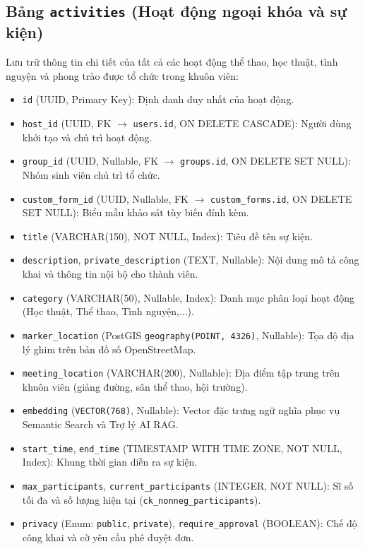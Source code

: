 \subsection{Bảng \texttt{activities} (Hoạt động ngoại khóa và sự kiện)}
Lưu trữ thông tin chi tiết của tất cả các hoạt động thể thao, học thuật, tình nguyện và phong trào được tổ chức trong khuôn viên:
\begin{itemize}[leftmargin=*, noitemsep, topsep=1pt]
    \item \texttt{id} (UUID, Primary Key): Định danh duy nhất của hoạt động.
    \item \texttt{host\_id} (UUID, FK $\rightarrow$ \texttt{users.id}, ON DELETE CASCADE): Người dùng khởi tạo và chủ trì hoạt động.
    \item \texttt{group\_id} (UUID, Nullable, FK $\rightarrow$ \texttt{groups.id}, ON DELETE SET NULL): Nhóm sinh viên chủ trì tổ chức.
    \item \texttt{custom\_form\_id} (UUID, Nullable, FK $\rightarrow$ \texttt{custom\_forms.id}, ON DELETE SET NULL): Biểu mẫu khảo sát tùy biến đính kèm.
    \item \texttt{title} (VARCHAR(150), NOT NULL, Index): Tiêu đề tên sự kiện.
    \item \texttt{description}, \texttt{private\_description} (TEXT, Nullable): Nội dung mô tả công khai và thông tin nội bộ cho thành viên.
    \item \texttt{category} (VARCHAR(50), Nullable, Index): Danh mục phân loại hoạt động (Học thuật, Thể thao, Tình nguyện,...).
    \item \texttt{marker\_location} (PostGIS \texttt{geography(POINT, 4326)}, Nullable): Tọa độ địa lý ghim trên bản đồ số OpenStreetMap.
    \item \texttt{meeting\_location} (VARCHAR(200), Nullable): Địa điểm tập trung trên khuôn viên (giảng đường, sân thể thao, hội trường).
    \item \texttt{embedding} (\texttt{VECTOR(768)}, Nullable): Vector đặc trưng ngữ nghĩa phục vụ Semantic Search và Trợ lý AI RAG.
    \item \texttt{start\_time}, \texttt{end\_time} (TIMESTAMP WITH TIME ZONE, NOT NULL, Index): Khung thời gian diễn ra sự kiện.
    \item \texttt{max\_participants}, \texttt{current\_participants} (INTEGER, NOT NULL): Sĩ số tối đa và số lượng hiện tại (\texttt{ck\_nonneg\_participants}).
    \item \texttt{privacy} (Enum: \texttt{public}, \texttt{private}), \texttt{require\_approval} (BOOLEAN): Chế độ công khai và cờ yêu cầu phê duyệt đơn.

\end{itemize}
